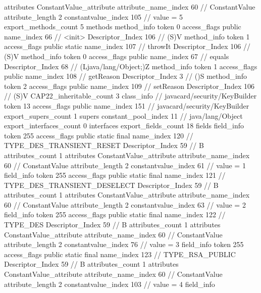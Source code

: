 {{{{{				attributes {
				ConstantValue_attribute {
					attribute_name_index	60		// ConstantValue
					attribute_length	2
					constantvalue_index	105		// value = 5
				}
				}
			}
			}
			export_methods_count	5
			methods {
				method_info {
					token	0
					access_flags	public
					name_index	66		// <init>
					Descriptor_Index	106		// (S)V
				}
				method_info {
					token	1
					access_flags	public static
					name_index	107		// throwIt
					Descriptor_Index	106		// (S)V
				}
				method_info {
					token	0
					access_flags	public
					name_index	67		// equals
					Descriptor_Index	68		// (Ljava/lang/Object;)Z
				}
				method_info {
					token	1
					access_flags	public
					name_index	108		// getReason
					Descriptor_Index	3		// ()S
				}
				method_info {
					token	2
					access_flags	public
					name_index	109		// setReason
					Descriptor_Index	106		// (S)V
				}
			}
			CAP22_inheritable_count	3
		}
		class_info {		// javacard/security/KeyBuilder
			token	13
			access_flags	public
			name_index	151		// javacard/security/KeyBuilder
			export_supers_count	1
			supers {
				constant_pool_index	11		// java/lang/Object
			}
			export_interfaces_count	0
			interfaces {
			}
			export_fields_count	18
			fields {
			field_info {
				token	255
				access_flags	public static final
				name_index	120		// TYPE_DES_TRANSIENT_RESET
				Descriptor_Index	59		// B
				attributes_count	1
				attributes {
				ConstantValue_attribute {
					attribute_name_index	60		// ConstantValue
					attribute_length	2
					constantvalue_index	61		// value = 1
				}
				}
			}
			field_info {
				token	255
				access_flags	public static final
				name_index	121		// TYPE_DES_TRANSIENT_DESELECT
				Descriptor_Index	59		// B
				attributes_count	1
				attributes {
				ConstantValue_attribute {
					attribute_name_index	60		// ConstantValue
					attribute_length	2
					constantvalue_index	63		// value = 2
				}
				}
			}
			field_info {
				token	255
				access_flags	public static final
				name_index	122		// TYPE_DES
				Descriptor_Index	59		// B
				attributes_count	1
				attributes {
				ConstantValue_attribute {
					attribute_name_index	60		// ConstantValue
					attribute_length	2
					constantvalue_index	76		// value = 3
				}
				}
			}
			field_info {
				token	255
				access_flags	public static final
				name_index	123		// TYPE_RSA_PUBLIC
				Descriptor_Index	59		// B
				attributes_count	1
				attributes {
				ConstantValue_attribute {
					attribute_name_index	60		// ConstantValue
					attribute_length	2
					constantvalue_index	103		// value = 4
				}
				}
			}
			field_info {
}}}}}
